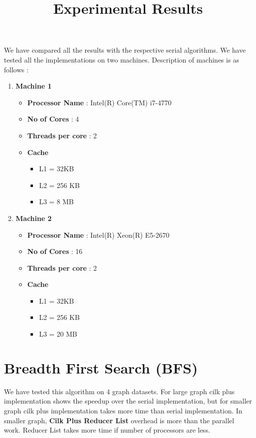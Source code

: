 \documentclass{article}
\begin{document}
\title{Experimental Results}
\date{}
\maketitle

We have compared all the results with the respective serial algorithms. We have tested all the implementations on two machines. Description of machines is as follows :

\begin{enumerate}
\item \textbf{Machine 1} 
\begin{itemize}
\item \textbf{Processor Name} : Intel(R) Core(TM) i7-4770  
\item \textbf{No of Cores} : 4
\item \textbf{Threads per core} : 2
\item \textbf{Cache}
\begin{itemize}
\item L1 = 32KB
\item L2 = 256 KB
\item L3 = 8 MB
\end{itemize}
\end{itemize}

\item \textbf{Machine 2}
\begin{itemize}
\item \textbf{Processor Name} : Intel(R) Xeon(R)  E5-2670  
\item \textbf{No of Cores} : 16
\item \textbf{Threads per core} : 2
\item \textbf{Cache}
\begin{itemize}
\item L1 = 32KB
\item L2 = 256 KB
\item L3 = 20 MB
\end{itemize}
\end{itemize}

\end{enumerate}


\section{Breadth First Search (BFS)}
We have tested this algorithm on 4 graph datasets. For large graph cilk plus implementation shows the speedup over the serial implementation, but for smaller graph cilk plus implementation takes more time than serial implementation. In smaller graph, \textbf{Cilk Plus Reducer List} overhead is more than the parallel work. Reducer List takes more time if number of processors are less. \\
\end{document}
